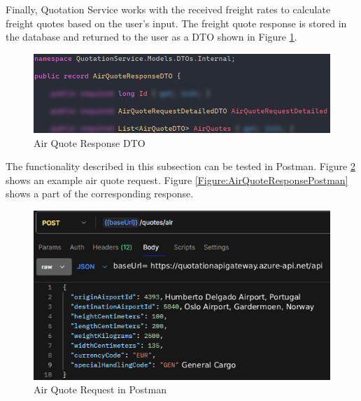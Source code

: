 \documentclass[12pt,reqno, oneside]{amsbook}
\theoremstyle{definition}
\theoremstyle{definition}
\numberwithin{section}{chapter}
\numberwithin{table}{chapter}
\numberwithin{figure}{chapter}
\begin{document}
Finally, Quotation Service works with the received freight rates to calculate freight quotes based on the user's input. The freight quote response is stored in the database and returned to the user as a \ac{DTO} shown in Figure \ref{Figure:AirQuoteResponseDTO}.

\begin{figure}[H]
  \centering
  \includegraphics[width=0.9\linewidth]{images/AirQuoteResponseDTO.png}
  \caption{\label{Figure:AirQuoteResponseDTO}Air Quote Response DTO}
\end{figure}

The functionality described in this subsection can be tested in Postman. Figure \ref{Figure:AirQuoteRequestPostman} shows an example air quote request. Figure \ref{Figure:AirQuoteResponsePostman} shows a part of the corresponding response.


\begin{figure}[H]
  \centering
  \includegraphics[width=0.9\linewidth]{images/AirQuoteRequestPostman.png}
  \caption{\label{Figure:AirQuoteRequestPostman}Air Quote Request in Postman}
\end{figure}
\end{document}

